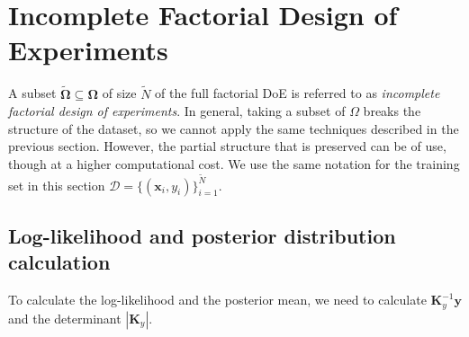 \section{Incomplete Factorial Design of Experiments}

A subset $\boldsymbol{\widetilde{\Omega}} \subseteq \boldsymbol{\Omega}$ of size
$\widetilde{N}$ of the full factorial DoE
is referred to as {\em incomplete factorial design of experiments}.
In general, taking a subset of $\Omega$ breaks the structure of the dataset,
so we cannot apply the same techniques described in the previous section.
However, the partial structure that is preserved can be of use,
though at a higher computational cost.
We use the same notation for the training set in this section
$\mathcal{D} = \{(\mathbf{x}_i, y_i)\}_{i=1}^{\widetilde{N}}$.

\subsection{Log-likelihood and posterior distribution calculation}

To calculate the log-likelihood and the posterior mean, we need to calculate
$\mathbf{K}_y^{-1}\mathbf{y}$ and the determinant $|\mathbf{K}_y|$.

